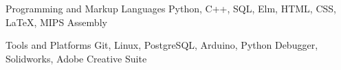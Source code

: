

\begin{cvskills}

  \cvskill
    {Programming and Markup Languages} %
    {Python, C++, SQL, Elm, HTML, CSS, LaTeX, MIPS Assembly} %

  \cvskill
    {Tools and Platforms} %
    {Git, Linux, PostgreSQL, Arduino, Python Debugger, Solidworks, Adobe Creative Suite} %

\end{cvskills}
